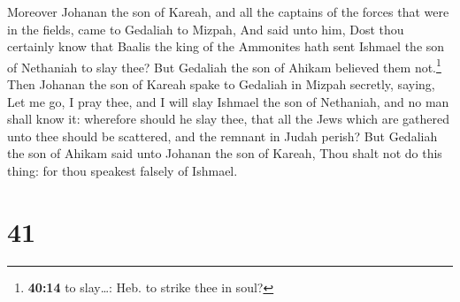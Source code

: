  Moreover Johanan the son of Kareah, and all the captains
of the forces that were in the fields, came to Gedaliah to Mizpah,
 And said unto him, Dost thou certainly know that Baalis
the king of the Ammonites hath sent Ishmael the son of Nethaniah to slay
thee? But Gedaliah the son of Ahikam believed them not.\footnote{\textbf{40:14}
  to slay\ldots: Heb. to strike thee in soul?}  Then
Johanan the son of Kareah spake to Gedaliah in Mizpah secretly, saying,
Let me go, I pray thee, and I will slay Ishmael the son of Nethaniah,
and no man shall know it: wherefore should he slay thee, that all the
Jews which are gathered unto thee should be scattered, and the remnant
in Judah perish?  But Gedaliah the son of Ahikam said
unto Johanan the son of Kareah, Thou shalt not do this thing: for thou
speakest falsely of Ishmael.

\hypertarget{section-40}{%
\section{41}\label{section-40}}

